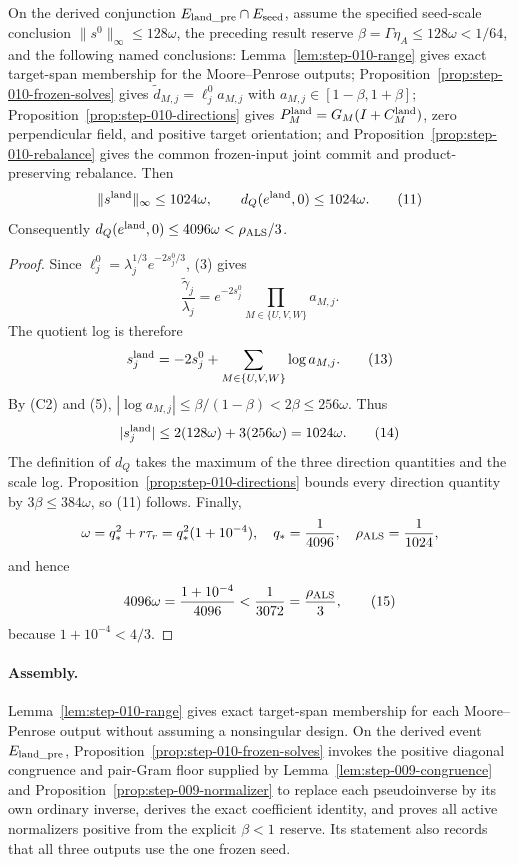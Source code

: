 \begin{proposition}\label{prop:step-010-quotient-entry}
On the derived conjunction
\(E_{\rm land\_pre}\cap E_{\rm seed}\), assume the specified seed-scale
conclusion \(\|s^0\|_\infty\le128\omega\), the preceding result reserve
\(\beta=\Gamma\eta_A\le128\omega<1/64\), and the following named
conclusions: Lemma~\ref{lem:step-010-range} gives exact target-span
membership for the Moore--Penrose outputs; Proposition~\ref{prop:step-010-frozen-solves}
gives \(\widetilde d_{M,j}=\ell_j^0a_{M,j}\) with
\(a_{M,j}\in[1-\beta,1+\beta]\); Proposition~\ref{prop:step-010-directions}
gives \(P_M^{\rm land}=G_M(I+C_M^{\rm land})\), zero perpendicular field, and
positive target orientation; and Proposition~\ref{prop:step-010-rebalance} gives the common
frozen-input joint commit and product-preserving rebalance.  Then
\[
\|s^{\rm land}\|_\infty\le1024\omega,\qquad
d_Q(e^{\rm land},0)\le1024\omega.
\tag{11}
\]
Consequently \(d_Q(e^{\rm land},0)\le4096\omega<\rho_{\rm ALS}/3\).

\begin{proof}
Since
\(\ell_j^0=\lambda_j^{1/3}e^{-2s_j^0/3}\), (3) gives
\[
\frac{\widetilde\gamma_j}{\lambda_j}
=e^{-2s_j^0}\prod_{M\in\{U,V,W\}}a_{M,j}.
\tag{12}
\]
The quotient log is therefore
\[
s_j^{\rm land}=-2s_j^0+\sum_{M\in\{U,V,W\}}\log a_{M,j}. \tag{13}
\]
By (C2) and (5), \(|\log a_{M,j}|\le\beta/(1-\beta)<2\beta\le256\omega\).
Thus
\[
|s_j^{\rm land}|\le2(128\omega)+3(256\omega)=1024\omega. \tag{14}
\]
The definition of \(d_Q\) takes the maximum of the three direction
quantities and the scale log.  Proposition~\ref{prop:step-010-directions}
bounds every direction quantity by \(3\beta\le384\omega\), so (11) follows.
Finally,
\[
\omega=q_*^2+r\tau_r=q_*^2(1+10^{-4}),\quad
q_*={1\over4096},\quad \rho_{\rm ALS}={1\over1024},
\]
and hence
\[
4096\omega={1+10^{-4}\over4096}
<{1\over3072}={\rho_{\rm ALS}\over3},
\tag{15}
\]
because \(1+10^{-4}<4/3\).

\end{proof}
\end{proposition}
\paragraph{Assembly.}

Lemma~\ref{lem:step-010-range} gives exact target-span membership for each
Moore--Penrose output without assuming a nonsingular design.  On the derived
event \(E_{\rm land\_pre}\), Proposition~\ref{prop:step-010-frozen-solves}
invokes the positive diagonal congruence and pair-Gram floor supplied by
Lemma~\ref{lem:step-009-congruence} and
Proposition~\ref{prop:step-009-normalizer} to replace each pseudoinverse by
its own ordinary inverse, derives the exact coefficient identity, and proves
all active normalizers positive from the explicit \(\beta<1\) reserve.  Its
statement also records that all three outputs use the one frozen seed.

